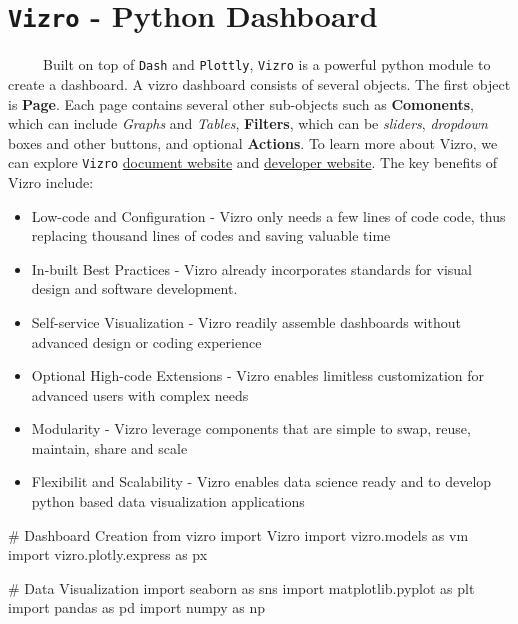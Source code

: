 \documentclass[
  letterpaper,
  DIV=11,
  numbers=noendperiod]{scrreprt}
\newenvironment{Shaded}{\begin{snugshade}}{\end{snugshade}}
\newcommand{\CommentTok}[1]{\textcolor[rgb]{0.37,0.37,0.37}{#1}}
\newcommand{\ImportTok}[1]{\textcolor[rgb]{0.00,0.46,0.62}{#1}}
\newcommand{\NormalTok}[1]{\textcolor[rgb]{0.00,0.23,0.31}{#1}}
\begin{document}
\section{\texorpdfstring{\texttt{Vizro} - Python
Dashboard}{Vizro - Python Dashboard}}\label{vizro---python-dashboard}

~~~~~Built on top of \texttt{Dash} and \texttt{Plottly}, \texttt{Vizro}
is a powerful python module to create a dashboard. A vizro dashboard
consists of several objects. The first object is \textbf{Page}. Each
page contains several other sub-objects such as \textbf{Comonents},
which can include \emph{Graphs} and \emph{Tables}, \textbf{Filters},
which can be \emph{sliders}, \emph{dropdown} boxes and other buttons,
and optional \textbf{Actions}. To learn more about Vizro, we can explore
\texttt{Vizro}
\href{https://vizro.readthedocs.io/en/stable/pages/tutorials/first-dashboard/}{document
website} and \href{https://github.com/mckinsey/vizro}{developer
website}. The key benefits of Vizro include:

\begin{itemize}
\item
  Low-code and Configuration - Vizro only needs a few lines of code
  code, thus replacing thousand lines of codes and saving valuable time
\item
  In-built Best Practices - Vizro already incorporates standards for
  visual design and software development.
\item
  Self-service Visualization - Vizro readily assemble dashboards without
  advanced design or coding experience
\item
  Optional High-code Extensions - Vizro enables limitless customization
  for advanced users with complex needs
\item
  Modularity - Vizro leverage components that are simple to swap, reuse,
  maintain, share and scale
\item
  Flexibilit and Scalability - Vizro enables data science ready and to
  develop python based data visualization applications
\end{itemize}

\begin{Shaded}
\begin{Highlighting}[]
\CommentTok{\# Dashboard Creation }
\ImportTok{from}\NormalTok{ vizro }\ImportTok{import}\NormalTok{ Vizro}
\ImportTok{import}\NormalTok{ vizro.models }\ImportTok{as}\NormalTok{ vm}
\ImportTok{import}\NormalTok{ vizro.plotly.express }\ImportTok{as}\NormalTok{ px}

\CommentTok{\# Data Visualization }
\ImportTok{import}\NormalTok{ seaborn }\ImportTok{as}\NormalTok{ sns}
\ImportTok{import}\NormalTok{ matplotlib.pyplot }\ImportTok{as}\NormalTok{ plt}
\ImportTok{import}\NormalTok{ pandas }\ImportTok{as}\NormalTok{ pd}
\ImportTok{import}\NormalTok{ numpy }\ImportTok{as}\NormalTok{ np}
\end{Highlighting}
\end{Shaded}
\end{document}
